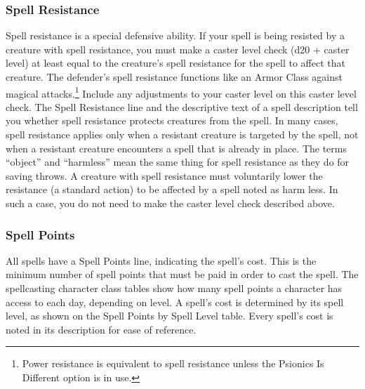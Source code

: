 \subsubsection{Spell Resistance}
Spell resistance is a special defensive ability. If your spell is being resisted by a creature with spell resistance, you must make a caster level check (d20 + caster level) at least equal to the creature's spell resistance for the spell to affect that creature. The defender's spell resistance functions like an Armor Class against magical attacks.\footnote{Power resistance is equivalent to spell resistance unless the Psionics Is Different option is in use.} Include any adjustments to your caster level on this caster level check.
The Spell Resistance line and the descriptive text of a spell description tell you whether spell resistance protects creatures from the spell. In many cases, spell resistance applies only when a resistant creature is targeted by the spell, not when a resistant creature encounters a spell that is already in place.
The terms “object” and “harmless” mean the same thing for spell resistance as they do for saving throws. A creature with spell resistance must voluntarily lower the resistance (a standard action) to be affected by a spell noted as harm less. In such a case, you do not need to make the caster level check described above.

\subsubsection{Spell Points}
All spells have a Spell Points line, indicating the spell's cost. This is the minimum number of spell points that must be paid in order to cast the spell.
The spellcasting character class tables show how many spell points a character has access to each day, depending on level.
A spell's cost is determined by its spell level, as shown on the Spell Points by Spell Level table. %
Every spell's cost is noted in its description for ease of reference.
\begin{center}
\end{center}

